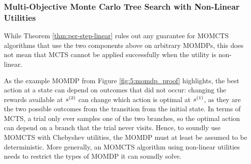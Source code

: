 

    
\subsubsection{Multi-Objective Monte Carlo Tree Search with Non-Linear Utilities}
\label{sec:5-6-2-1-non_linear_utilities}

    While Theorem \ref{thm:per-step-linear} rules out any guarantee for MOMCTS algorithms that use the two components above on arbitrary MOMDPs, this does not mean that MCTS cannot be applied successfully when the utility is non-linear.
    
    As the example MOMDP from Figure \ref{fig:5:momdp_proof} highlights, the best action at a state can depend on outcomes that did not occur: changing the rewards available at $s^{(2)}$ can change which action is optimal at $s^{(1)}$, as they are the two possible outcomes from the transition from the initial state. In terms of MCTS, a trial only ever samples one of the two branches, so the optimal action can depend on a branch that the trial never visits. Hence, to soundly use MOMCTS with Chebyshev utilities, the MOMDP must at least be assumed to be deterministic. More generally, an MOMCTS algorithm using non-linear utilities needs to restrict the types of MOMDP it can soundly solve. 

